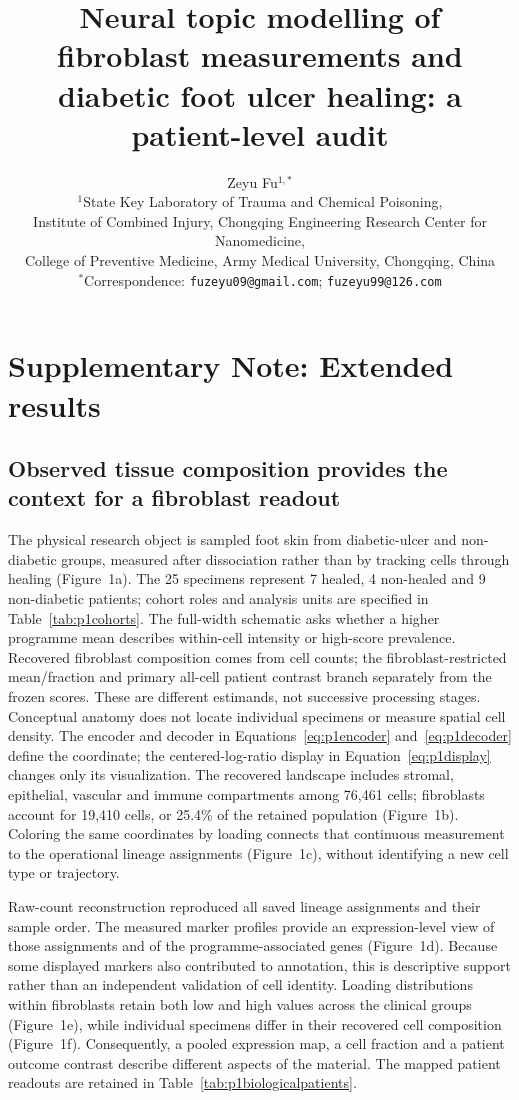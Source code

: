 \documentclass[10pt,a4paper]{article}
\title{Neural topic modelling of fibroblast measurements and diabetic foot ulcer healing: a patient-level audit}
\author{Zeyu Fu$^{1,*}$\\[3pt]\small $^1$State Key Laboratory of Trauma and Chemical Poisoning,\\\small Institute of Combined Injury, Chongqing Engineering Research Center for Nanomedicine,\\\small College of Preventive Medicine, Army Medical University, Chongqing, China\\\small $^*$Correspondence: \texttt{fuzeyu09@gmail.com}; \texttt{fuzeyu99@126.com}}\date{}
\begin{document}
\renewcommand{\thefigure}{S\arabic{figure}}
\maketitle
\modulolinenumbers[5]\linenumbers\supplement
\section*{Supplementary Note: Extended results}
\subsection{Observed tissue composition provides the context for a fibroblast readout}




The physical research object is sampled foot skin from diabetic-ulcer and non-diabetic groups, measured after dissociation rather than by tracking cells through healing (Figure~1a\label{call:p1f1}). The 25 specimens represent 7 healed, 4 non-healed and 9 non-diabetic patients; cohort roles and analysis units are specified in Table~\ref{tab:p1cohorts}. The full-width schematic asks whether a higher programme mean describes within-cell intensity or high-score prevalence. Recovered fibroblast composition comes from cell counts; the fibroblast-restricted mean/fraction and primary all-cell patient contrast branch separately from the frozen scores. These are different estimands, not successive processing stages. Conceptual anatomy does not locate individual specimens or measure spatial cell density. The encoder and decoder in Equations~\eqref{eq:p1encoder} and~\eqref{eq:p1decoder} define the coordinate; the centered-log-ratio display in Equation~\eqref{eq:p1display} changes only its visualization. The recovered landscape includes stromal, epithelial, vascular and immune compartments among 76,461 cells; fibroblasts account for 19,410 cells, or 25.4\% of the retained population (Figure~1b). Coloring the same coordinates by loading connects that continuous measurement to the operational lineage assignments (Figure~1c), without identifying a new cell type or trajectory.

Raw-count reconstruction reproduced all saved lineage assignments and their sample order. The measured marker profiles provide an expression-level view of those assignments and of the programme-associated genes (Figure~1d). Because some displayed markers also contributed to annotation, this is descriptive support rather than an independent validation of cell identity. Loading distributions within fibroblasts retain both low and high values across the clinical groups (Figure~1e), while individual specimens differ in their recovered cell composition (Figure~1f). Consequently, a pooled expression map, a cell fraction and a patient outcome contrast describe different aspects of the material. The mapped patient readouts are retained in Table~\ref{tab:p1biologicalpatients}.
\end{document}
